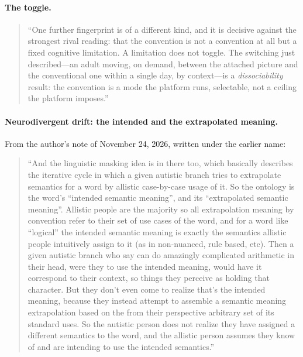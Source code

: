 \paragraph{The toggle.}
\begin{quote}
``One further fingerprint is of a different kind, and it is decisive against the strongest rival reading: that the convention is not a convention at all but a fixed cognitive limitation. A limitation does not toggle. The switching just described---an adult moving, on demand, between the attached picture and the conventional one within a single day, by context---is a \emph{dissociability} result: the convention is a mode the platform runs, selectable, not a ceiling the platform imposes.''
\end{quote}

\paragraph{Neurodivergent drift: the intended and the extrapolated meaning.} From the author's note of November 24, 2026, written under the earlier name:
\begin{quote}
``And the linguistic masking idea is in there too, which basically describes the iterative cycle in which a given autistic branch tries to extrapolate semantics for a word by allistic case-by-case usage of it. So the ontology is the word's ``intended semantic meaning'', and its ``extrapolated semantic meaning''. Allistic people are the majority so all extrapolation meaning by convention refer to their set of use cases of the word, and for a word like ``logical'' the intended semantic meaning is exactly the semantics allistic people intuitively assign to it (as in non-nuanced, rule based, etc). Then a given autistic branch who say can do amazingly complicated arithmetic in their head, were they to use the intended meaning, would have it correspond to their context, so things they perceive as holding that character. But they don't even come to realize that's the intended meaning, because they instead attempt to assemble a semantic meaning extrapolation based on the from their perspective arbitrary set of its standard uses. So the autistic person does not realize they have assigned a different semantics to the word, and the allistic person assumes they know of and are intending to use the intended semantics.''
\end{quote}

